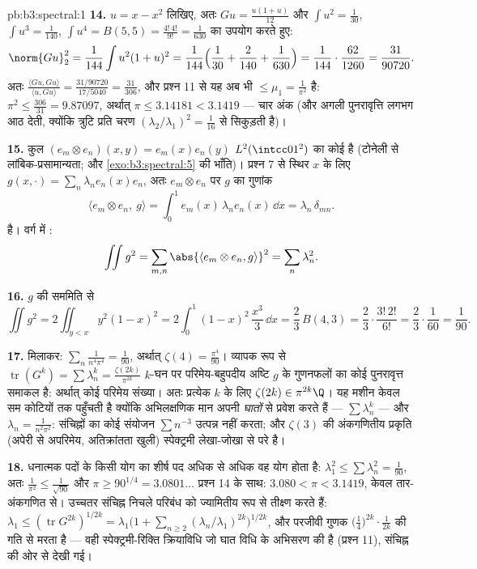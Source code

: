 \begin{solution}{pb:b3:spectral:1}
\textbf{14.} $u = x - x^2$ लिखिए, अतः $Gu =
\frac{u(1 + u)}{12}$ और $\int u^2 = \frac1{30}$, $\int u^3 = \frac1{140}$, $\int u^4 = B(5,5) =
\frac{4!\,4!}{9!} = \frac1{630}$ का उपयोग
करते हुए:
\[
\norm{Gu}_2^2 = \frac1{144}\int u^2(1+u)^2 =
\frac1{144}\Bigl(\frac1{30} + \frac2{140} +
\frac1{630}\Bigr) = \frac1{144}\cdot\frac{62}{1260} =
\frac{31}{90720} .
\]
अतः $\frac{\langle Gu, Gu\rangle}{\langle u, Gu\rangle} =
\frac{31/90720}{17/5040} = \frac{31}{306}$, और प्रश्न 11 से यह अब भी $\leq \mu_1 = \frac1{\pi^2}$ है: $\pi^2 \leq
\frac{306}{31} = 9.87097$, अर्थात् $\pi \leq 3.14181 <
3.1419$
--- चार अंक (और अगली पुनरावृत्ति लगभग आठ देती, क्योंकि त्रुटि प्रति
चरण $(\lambda_2/\lambda_1)^2 = \frac1{16}$ से सिकुड़ती है)।

\textbf{15.} कुल $(e_m \otimes e_n)(x,y) =
e_m(x)e_n(y)$ $L^2(\intcc01^2)$ का कोई  है (टोनेली से
लांबिक-प्रसामान्यता; और  \cref{exo:b3:spectral:5} की भाँति)। प्रश्न 7 से स्थिर
$x$ के लिए $g(x, \cdot) = \sum_n\lambda_ne_n(x)e_n$, अतः $e_m\otimes e_n$ पर $g$ का गुणांक
\[
\langle e_m\otimes e_n,\ g\rangle
= \int_0^1 e_m(x)\,\lambda_n e_n(x)\,\dd x
= \lambda_n\,\delta_{mn} .
\]
है। वर्ग में :
\[
\iint g^2 = \sum_{m,n}\abs{\langle e_m\otimes e_n,
g\rangle}^2 = \sum_n\lambda_n^2 .
\]

\textbf{16.} $g$ की सममिति से
\[
\iint g^2 = 2\iint_{y<x}y^2(1-x)^2
= 2\int_0^1(1-x)^2\,\frac{x^3}3\,\dd x
= \frac23\,B(4, 3) = \frac23\cdot\frac{3!\,2!}{6!}
= \frac23\cdot\frac1{60} = \frac1{90} .
\]

\textbf{17.} मिलाकर: $\sum_n\frac1{n^4\pi^4} =
\frac1{90}$, अर्थात् $\zeta(4) = \frac{\pi^4}{90}$। व्यापक रूप से $\operatorname{tr}(G^k) = \sum\lambda_n^k =
\frac{\zeta(2k)}{\pi^{2k}}$ $k$-घन
पर परिमेय-बहुपदीय अष्टि $g$ के गुणनफलों का कोई पुनरावृत्त समाकल
है: अर्थात् कोई परिमेय संख्या। अतः प्रत्येक $k$ के लिए $\zeta(2k) \in
\pi^{2k}\Q$। यह
मशीन केवल सम कोटियों तक पहुँचती है क्योंकि अभिलक्षणिक मान अपनी
\emph{घातों} से प्रवेश करते हैं --- $\sum\lambda_n^k$ --- और $\lambda_n =
\frac1{n^2\pi^2}$: संचिह्नों का
कोई संयोजन $\sum
n^{-3}$ उत्पन्न नहीं करता; और $\zeta(3)$ की अंकगणितीय प्रकृति
(अपेरी से अपरिमेय, अतिक्रांतता खुली) स्पेक्ट्रमी लेखा-जोखा से परे
है।

\textbf{18.} धनात्मक पदों के किसी योग का शीर्ष पद अधिक से अधिक वह
योग होता है: $\lambda_1^2 \leq \sum\lambda_n^2 =
\frac1{90}$, अतः $\frac1{\pi^2} \leq \frac1{\sqrt{90}}$ और $\pi \geq 90^{1/4} = 3.0801\ldots$ प्रश्न 14 के साथ: $3.080 < \pi < 3.1419$,
केवल तार-अंकगणित से। उच्चतर संचिह्न निचले परिबंध को ज्यामितीय रूप
से तीक्ष्ण करते हैं: $\lambda_1 \leq (\operatorname{tr}G^{2k})^{1/2k} =
\lambda_1\bigl(1 + \sum_{n\geq2}(\lambda_n/\lambda_1)^{2k}
\bigr)^{1/2k}$, और परजीवी गुणक $\bigl(\tfrac14\bigr)^{2k}\cdot\frac1{2k}$ की गति से मरता है
--- वही स्पेक्ट्रमी-रिक्ति क्रियाविधि जो घात विधि के अभिसरण की है
(प्रश्न 11), संचिह्न की ओर से देखी गई।


\end{solution}

